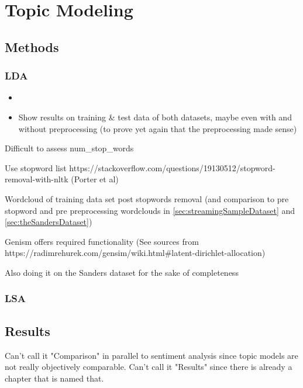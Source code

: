 \chapter{Topic Modeling}
\label{ch:topicModeling}


\section{Methods}
\label{sec:methods}

\subsection{LDA}
\label{subsec:lda}

\begin{itemize}
    \item

    \item
    Show results on training & test data of both datasets, maybe even with and without preprocessing (to prove yet again that the preprocessing made sense)

\end{itemize}

Difficult to assess num_stop_words

Use stopword list https://stackoverflow.com/questions/19130512/stopword-removal-with-nltk (Porter et al)

Wordcloud of training data set post stopwords removal (and comparison to pre stopword and pre preprocessing wordclouds in \ref{sec:streamingSampleDataset} and \ref{sec:theSandersDataset})

Genism offers required functionality (See sources from https://radimrehurek.com/gensim/wiki.html#latent-dirichlet-allocation)

Also doing it on the Sanders dataset for the sake of completeness

\subsection{LSA}
\label{subsec:lsa}

\section{Results}
\label{sec:results}

Can't call it "Comparison" in parallel to sentiment analysis since topic models are not really objectively comparable.
Can't call it "Results" since there is already a chapter that is named that.